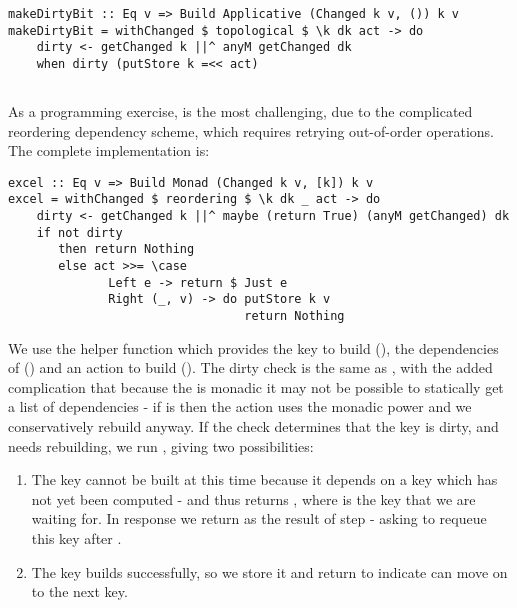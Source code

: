 \begin{verbatim}
makeDirtyBit :: Eq v => Build Applicative (Changed k v, ()) k v
makeDirtyBit = withChanged $ topological $ \k dk act -> do
    dirty <- getChanged k ||^ anyM getChanged dk
    when dirty (putStore k =<< act)
\end{verbatim}

\subsection{\Excel}\label{sec-implementation-excel}

As a programming exercise, \Excel is the most challenging, due to the complicated reordering dependency scheme, which requires retrying out-of-order operations. The complete implementation is:

\begin{verbatim}
excel :: Eq v => Build Monad (Changed k v, [k]) k v
excel = withChanged $ reordering $ \k dk _ act -> do
    dirty <- getChanged k ||^ maybe (return True) (anyM getChanged) dk
    if not dirty
       then return Nothing
       else act >>= \case
              Left e -> return $ Just e
              Right (_, v) -> do putStore k v
                                 return Nothing
\end{verbatim}

We use the helper function  which provides the key to build (), the dependencies of  () and an action to build  (). The dirty check is the same as , with the added complication that because the  is monadic it may not be possible to statically get a list of dependencies - if  is  then the action uses the monadic power and we conservatively rebuild anyway. If the check determines that the key is dirty, and needs rebuilding, we run , giving two possibilities:

\begin{enumerate}
\item The key cannot be built at this time because it depends on a key which has not yet been computed - and thus  returns , where  is the key that we are waiting for. In response we return  as the result of step - asking  to requeue this key after .
\item The key builds successfully, so we store it and return  to indicate  can move on to the next key.
\end{enumerate}

